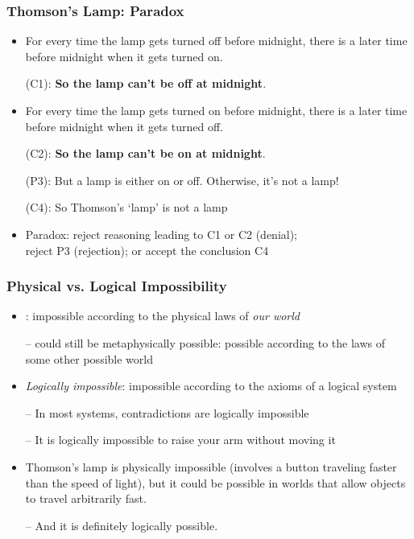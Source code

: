 \begin{frame}
\frametitle{Thomson's Lamp: Paradox}

\begin{itemize}[<+->]

\item For every time the lamp gets turned off before midnight, there is a later time before midnight when it gets turned on. 
\item[(C1):] \textbf{So the lamp can't be off at midnight}.

\item For every time the lamp gets turned on before midnight, there is a later time before midnight when it gets turned off. 
\item[(C2):] \textbf{So the lamp can't be on at midnight}.

\item[(P3):] But a lamp is either on or off. Otherwise, it's not a lamp!

\item[(C4):] So Thomson's `lamp' is not a lamp

\item Paradox: reject reasoning leading to C1 or C2 (denial); \\ reject P3 (rejection); or accept the conclusion C4

\end{itemize}
\end{frame}

\begin{frame}
\frametitle{Physical vs. Logical Impossibility}

\begin{itemize}[<+->]

\item {}: impossible according to the physical laws of  \textit{our world}

\item[] -- could still be metaphysically possible: possible according to the laws of some other possible world

\item \emph{Logically impossible}: impossible according to the axioms of a logical system

\item[] -- In most systems, contradictions are logically impossible 
\item[] -- It is logically impossible to raise your arm without moving it

\item Thomson's lamp is physically impossible (involves a button traveling faster than the speed of light), but it could be possible in worlds that allow objects to travel arbitrarily fast. 

\item[] -- And it is definitely logically possible. 


\end{itemize}
\end{frame}

